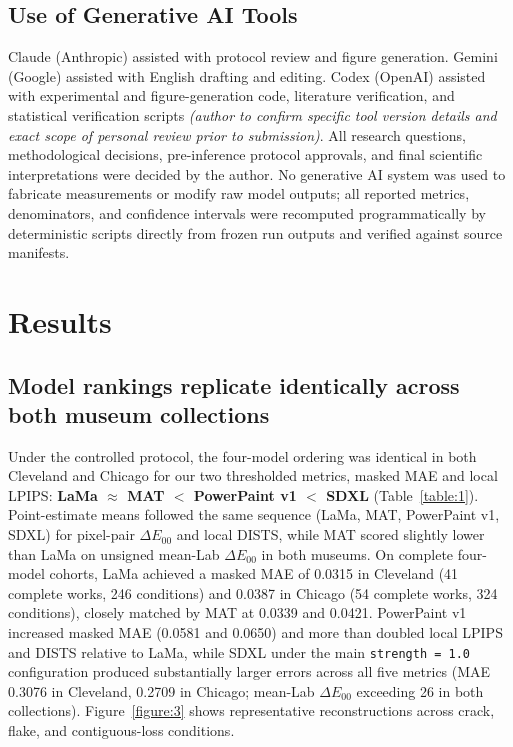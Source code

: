 \documentclass[applsci,article,submit,pdftex,moreauthors]{Definitions/mdpi}
\begin{document}
\subsection{Use of Generative AI Tools}\label{use-of-generative-ai-tools}

Claude (Anthropic) assisted with protocol review and figure generation. Gemini (Google) assisted with English drafting and editing. Codex (OpenAI) assisted with experimental and figure-generation code, literature verification, and statistical verification scripts \emph{(author to confirm specific tool version details and exact scope of personal review prior to submission)}. All research questions, methodological decisions, pre-inference protocol approvals, and final scientific interpretations were decided by the author. No generative AI system was used to fabricate measurements or modify raw model outputs; all reported metrics, denominators, and confidence intervals were recomputed programmatically by deterministic scripts directly from frozen run outputs and verified against source manifests.

\section{Results}\label{results}

\subsection{Model rankings replicate identically across both museum collections}\label{model-rankings-replicate-identically-across-both-museum-collections}

Under the controlled protocol, the four-model ordering was identical in both Cleveland and Chicago for our two thresholded metrics, masked MAE and local LPIPS: \textbf{LaMa \(\approx\) MAT \(\!<\!\) PowerPaint v1 \(\!<\!\) SDXL} (Table~\ref{table:1}). Point-estimate means followed the same sequence (LaMa, MAT, PowerPaint v1, SDXL) for pixel-pair \texttt{\ensuremath{\Delta E_{00}}} and local DISTS, while MAT scored slightly lower than LaMa on unsigned mean-Lab \texttt{\ensuremath{\Delta E_{00}}} in both museums. On complete four-model cohorts, LaMa achieved a masked MAE of 0.0315 in Cleveland (41 complete works, 246 conditions) and 0.0387 in Chicago (54 complete works, 324 conditions), closely matched by MAT at 0.0339 and 0.0421. PowerPaint v1 increased masked MAE (0.0581 and 0.0650) and more than doubled local LPIPS and DISTS relative to LaMa, while SDXL under the main \texttt{strength\ =\ 1.0} configuration produced substantially larger errors across all five metrics (MAE 0.3076 in Cleveland, 0.2709 in Chicago; mean-Lab \texttt{\ensuremath{\Delta E_{00}}} exceeding 26 in both collections). Figure~\ref{figure:3} shows representative reconstructions across crack, flake, and contiguous-loss conditions.
\end{document}
